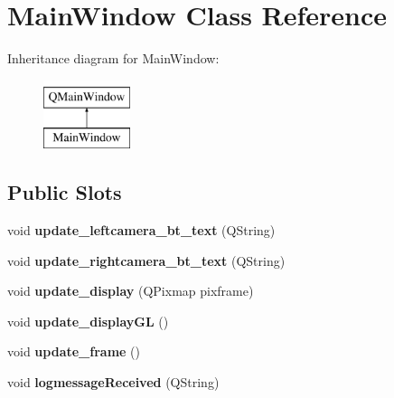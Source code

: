\hypertarget{class_main_window}{}\section{Main\+Window Class Reference}
\label{class_main_window}
Inheritance diagram for Main\+Window\+:\begin{figure}[H]
\begin{center}
\leavevmode
\includegraphics[height=2.000000cm]{class_main_window}
\end{center}
\end{figure}
\subsection*{Public Slots}
\begin{DoxyCompactItemize}
\item 
\mbox{\label{class_main_window_abfdbe0ea019000bfd161199cd14c328b}} 
void {\bfseries update\+\_\+leftcamera\+\_\+bt\+\_\+text} (Q\+String)
\item 
\mbox{\label{class_main_window_ad94b28204800c5747955d9f8227a0c46}} 
void {\bfseries update\+\_\+rightcamera\+\_\+bt\+\_\+text} (Q\+String)
\item 
\mbox{\label{class_main_window_ad75d5f2cba5f0d81568f9874c5672159}} 
void {\bfseries update\+\_\+display} (Q\+Pixmap pixframe)
\item 
\mbox{\label{class_main_window_a2693429cdbbbd48c60e81c46f9367525}} 
void {\bfseries update\+\_\+display\+GL} ()
\item 
\mbox{\label{class_main_window_a334ba1de922d99a9fdfc417825b0d7ac}} 
void {\bfseries update\+\_\+frame} ()
\item 
\mbox{\label{class_main_window_abc885123ff4eaba3f793c39a63a76ad3}} 
void {\bfseries logmessage\+Received} (Q\+String)
\end{DoxyCompactItemize}
